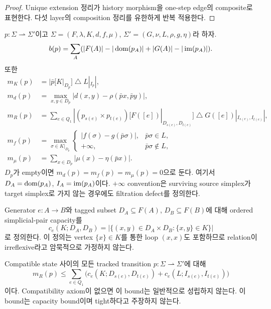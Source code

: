 \begin{proof}
Unique extension 정리가 history morphism을 one-step edge의 composite로
표현한다. 다섯 layer의 composition 정리를 유한하게 반복 적용한다.
\end{proof}

\begin{definition}
$p:\Sigma\rightharpoonup\Sigma'$이고
$\Sigma=(F,\lambda,K,d,f,\mu)$,
$\Sigma'=(G,\nu,L,\rho,g,\eta)$라 하자.
\[
b(p)=\sum_A(|F(A)|-|\operatorname{dom}(p_A)|+|G(A)|-|\operatorname{im}(p_A)|).
\]
또한
\begin{align*}
m_K(p)&=|\bar p[K|_{D_p}]\mathbin{\triangle}L|_{I_p}|,\\
m_d(p)&=\max_{x,y\in D_p}|d(x,y)-\rho(\bar p x,\bar p y)|,\\
m_R(p)&=\sum_{e\in Q_1}|(p_{s(e)}\times p_{t(e)})
 [F([e])|_{D_{s(e)},D_{t(e)}}]\mathbin{\triangle}
 G([e])|_{I_{s(e)},I_{t(e)}}|,\\
m_f(p)&=\max_{\sigma\in K|_{D_p}}
\begin{cases}
|f(\sigma)-g(\bar p\sigma)|,&\bar p\sigma\in L,\\
+\infty,&\bar p\sigma\notin L,
\end{cases}\\
m_\mu(p)&=\sum_{x\in D_p}|\mu(x)-\eta(\bar p x)|.
\end{align*}
$D_p$가 empty이면 $m_d(p)=m_f(p)=m_\mu(p)=0$으로 둔다. 여기서
$D_A=\operatorname{dom}(p_A)$, $I_A=\operatorname{im}(p_A)$이다. $+\infty$ convention은 surviving
source simplex가 target simplex로 가지 않는 경우에도 filtration defect를
정의한다.
\end{definition}

Generator $e:A\to B$와 tagged subset $D_A\subseteq F(A)$,
$D_B\subseteq F(B)$에 대해 ordered simplicial-pair capacity를
\[
c_e(K;D_A,D_B)=
\bigl|\{(x,y)\in D_A\times D_B:\{x,y\}\in K\}\bigr|
\]
로 정의한다. 이 정의는 vertex $\{x\}\in K$를 통한 loop $(x,x)$도 포함하므로
relation이 irreflexive라고 암묵적으로 가정하지 않는다.

\begin{proposition}
Compatible state 사이의 모든 tracked transition
$p:\Sigma\rightharpoonup\Sigma'$에 대해
\[
m_R(p)\leq
\sum_{e\in Q_1}\bigl(c_e(K;D_{s(e)},D_{t(e)})
+c_e(L;I_{s(e)},I_{t(e)})\bigr)
\]
이다. Compatibility axiom이 없으면 이 bound는 일반적으로 성립하지 않는다.
이 bound는 capacity bound이며 tight하다고 주장하지 않는다.
\end{proposition}

